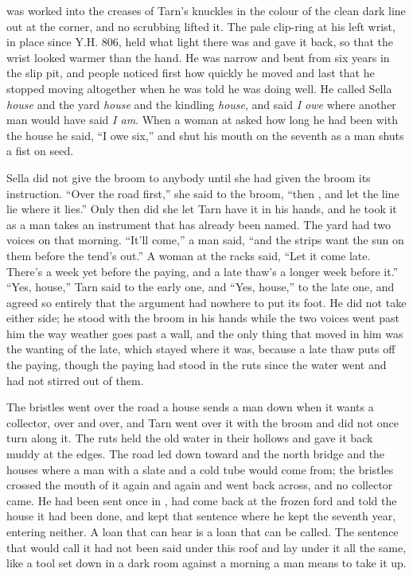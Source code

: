  was worked into the creases of Tarn's knuckles in the colour of the clean dark line out at the corner, and no scrubbing lifted it. The pale clip-ring at his left wrist, in place since Y.H. 806, held what light there was and gave it back, so that the wrist looked warmer than the hand. He was narrow and bent from six years in the slip pit, and people noticed first how quickly he moved and last that he stopped moving altogether when he was told he was doing well. He called Sella \emph{house} and the yard \emph{house} and the kindling \emph{house}, and said \emph{I owe} where another man would have said \emph{I am}. When a woman at  asked how long he had been with the house he said, “I owe six,” and shut his mouth on the seventh as a man shuts a fist on seed.

Sella did not give the broom to anybody until she had given the broom its instruction. “Over the road first,” she said to the broom, “then , and let the line lie where it lies.” Only then did she let Tarn have it in his hands, and he took it as a man takes an instrument that has already been named. The yard had two voices on  that morning. “It'll come,” a man said, “and the strips want the sun on them before the tend's out.” A woman at the racks said, “Let it come late. There's a week yet before the paying, and a late thaw's a longer week before it.” “Yes, house,” Tarn said to the early one, and “Yes, house,” to the late one, and agreed so entirely that the argument had nowhere to put its foot. He did not take either side; he stood with the broom in his hands while the two voices went past him the way weather goes past a wall, and the only thing that moved in him was the wanting of the late, which stayed where it was, because a late thaw puts off the paying, though the paying had stood in the ruts since the water went and had not stirred out of them.

The bristles went over the road a house sends a man down when it wants a collector, over and over, and Tarn went over it with the broom and did not once turn along it. The ruts held the old water in their hollows and gave it back muddy at the edges. The road led down toward  and the north bridge and the houses where a man with a slate and a cold tube would come from; the bristles crossed the mouth of it again and again and went back across, and no collector came. He had been sent once in , had come back at the frozen ford and told the house it had been done, and kept that sentence where he kept the seventh year, entering neither. A loan that can hear is a loan that can be called. The sentence that would call it had not been said under this roof and lay under it all the same, like a tool set down in a dark room against a morning a man means to take it up.

